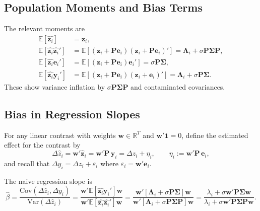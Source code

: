 \documentclass[11pt,a4paper]{article}
\newcommand{\Var}{\text{Var}}
\newcommand{\Cov}{\text{Cov}}
\begin{document}
\subsection{Population Moments and Bias Terms}

The relevant moments are
\begin{align}
  \mathbb E[\hat{\mathbf z_i}] &= \mathbf z_i,\\
  \mathbb E[\hat{\mathbf z_i}\hat{\mathbf z_i}'] &= 
\mathbb E[(\mathbf z_i + \mathbf P\mathbf e_i)(\mathbf z_i + \mathbf P\mathbf e_i)' ] =
    \mathbf \Lambda_i + \sigma\mathbf P\mathbf\Sigma\mathbf P,\\ 
  \mathbb E[\hat{\mathbf z_i}\mathbf e_i'] &= 
\mathbb E[(\mathbf z_i + \mathbf P\mathbf e_i)\mathbf e_i' ] = \sigma\mathbf P\mathbf\Sigma,\\
  \mathbb E[\hat{\mathbf z_i}\mathbf y_i'] &= 
\mathbb E[(\mathbf z_i + \mathbf P\mathbf e_i)(\mathbf z_i + \mathbf e_i)' ] = \mathbf \Lambda_i + \sigma\mathbf P\mathbf\Sigma.
\end{align}
These show variance inflation by $\sigma\mathbf P\mathbf\Sigma\mathbf P$ and contaminated covariances.

\subsection{Bias in Regression Slopes}

For any linear contrast with weights $\mathbf w\in\mathbb R^T$ and $\mathbf w'\mathbf 1=0$, define the estimated effect for the contrast by
$$
\Delta\hat z_i = \mathbf w'\hat{\mathbf z}_i = \mathbf w'\mathbf P\,\mathbf y_i = \Delta z_i + \eta_i,\qquad \eta_i:=\mathbf w'\mathbf P\,\mathbf e_i,
$$
and recall that $\Delta y_i = \Delta z_i + \varepsilon_i$ where $\varepsilon_i=\mathbf w'\mathbf e_i$. 

The naive regression slope is
\begin{equation}
\hat\beta = 
  \frac {\Cov(\Delta \hat z_i, \Delta y_i)}
        {\Var(\Delta \hat z_i)} =
  \frac {\mathbf w' \mathbb E[\hat{\mathbf z_i}\mathbf y_i ']\mathbf w}
        {\mathbf w' \mathbb E[\hat{\mathbf z_i}\hat{\mathbf z_i}']\mathbf w} =
  \frac {\mathbf w' [\mathbf \Lambda_i + \sigma \mathbf P\mathbf\Sigma]\mathbf w}
        {\mathbf w' [\mathbf \Lambda_i + \sigma \mathbf P\mathbf\Sigma\mathbf P]\mathbf w} =
  \frac {\lambda_i + \sigma \mathbf w' \mathbf P\mathbf\Sigma \mathbf w}
        {\lambda_i + \sigma \mathbf w' \mathbf P\mathbf\Sigma \mathbf P \mathbf w}. 
\end{equation}  
\end{document}

